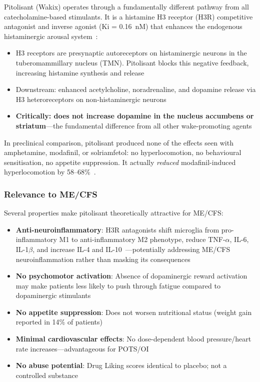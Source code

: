Pitolisant (Wakix) operates through a fundamentally different pathway from all catecholamine-based stimulants. It is a histamine H3 receptor (H3R) competitive antagonist and inverse agonist (Ki = 0.16~nM) that enhances the endogenous histaminergic arousal system~\cite{Collard2023pitolisant}:

\begin{itemize}
    \item H3 receptors are presynaptic autoreceptors on histaminergic neurons in the tuberomammillary nucleus (TMN). Pitolisant blocks this negative feedback, increasing histamine synthesis and release
    \item Downstream: enhanced acetylcholine, noradrenaline, and dopamine release via H3 heteroreceptors on non-histaminergic neurons
    \item \textbf{Critically: does not increase dopamine in the nucleus accumbens or striatum}---the fundamental difference from all other wake-promoting agents~\cite{Krief2021pitolisant}
\end{itemize}

In preclinical comparison, pitolisant produced none of the effects seen with amphetamine, modafinil, or solriamfetol: no hyperlocomotion, no behavioural sensitisation, no appetite suppression. It actually \textit{reduced} modafinil-induced hyperlocomotion by 58--68\%~\cite{Krief2021pitolisant}.

\subsubsection{Relevance to ME/CFS}

Several properties make pitolisant theoretically attractive for ME/CFS:
\begin{itemize}
    \item \textbf{Anti-neuroinflammatory}: H3R antagonists shift microglia from pro-inflammatory M1 to anti-inflammatory M2 phenotype, reduce TNF-$\alpha$, IL-6, IL-1$\beta$, and increase IL-4 and IL-10~\cite{Collard2023pitolisant}---potentially addressing ME/CFS neuroinflammation rather than masking its consequences
    \item \textbf{No psychomotor activation}: Absence of dopaminergic reward activation may make patients less likely to push through fatigue compared to dopaminergic stimulants
    \item \textbf{No appetite suppression}: Does not worsen nutritional status (weight gain reported in 14\% of patients)
    \item \textbf{Minimal cardiovascular effects}: No dose-dependent blood pressure/heart rate increases---advantageous for POTS/OI
    \item \textbf{No abuse potential}: Drug Liking scores identical to placebo; not a controlled substance
\end{itemize}

